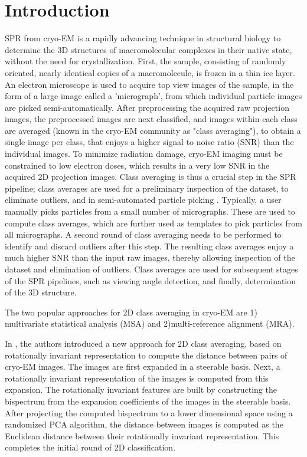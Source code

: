 \documentclass{article}
\begin{document}
\section{Introduction}
\label{sec:intro}
SPR from cryo-EM is a rapidly advancing technique in structural biology to determine
the 3D structures of macromolecular complexes in their native state,
 without the need for crystallization. First, the sample, consisting of randomly oriented, nearly identical copies of a macromolecule, is frozen in a thin ice layer. An electron microscope is used to acquire top view images of the sample, in the form of a large image called a 'micrograph', from which individual particle images are picked semi-automatically. After preprocessing the acquired raw projection images, the preprocessed images are next classified, and images within each class are averaged (known in the cryo-EM community as "class averaging"), to obtain a single image per class, that enjoys a higher signal to noise ratio (SNR) than the individual images. To minimize radiation damage, cryo-EM imaging must be constrained to low electron doses, which results in a very low SNR in the acquired 2D projection images. Class averaging is thus a crucial step in the SPR pipeline; class averages are used for a preliminary inspection of the dataset, to eliminate outliers, and in semi-automated particle picking \cite{relion}. Typically, a user manually picks particles from a small number of micrographs. These are used to compute class averages, which are further used as templates to pick particles from all micrographs. A second round of class averaging needs to be performed to identify and discard outliers after this step. The resulting class averages enjoy a much higher SNR than the input raw images, thereby allowing inspection of the dataset and elimination of outliers. Class averages are used for subsequent stages of the SPR pipelines, such as viewing angle detection, and finally, determination of the 3D structure.
 
The two popular approaches for 2D class averaging in cryo-EM are 1) multivariate statistical analysis (MSA) and 2)multi-reference alignment (MRA).

In \cite{zhao}, the authors introduced a new approach for 2D class averaging, based on rotationally invariant representation to compute the distance between pairs of cryo-EM images. The images are first expanded in a steerable basis. Next, a rotationally invariant representation of the images is computed from this expansion.
The rotationally invariant features are built by constructing the bispectrum from the expansion coefficients of the images in the steerable basis. After projecting the computed bispectrum to a lower dimensional space using a randomized PCA algorithm, the distance between images is computed as the Euclidean distance between their rotationally invariant representation. This completes the initial round of 2D classification. 
\end{document}
